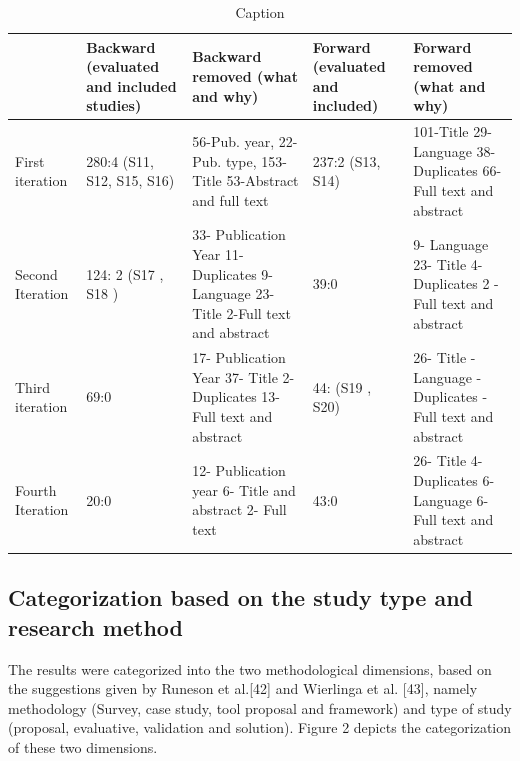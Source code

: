 \documentclass{article}
\begin{document}
\begin{table}[]
    
    \hline
    \begin{tabular}{|p{1.5cm}|p{2.5cm}|p{2.5cm}|p{2cm}|p{2cm}|}
   
         &  Backward (evaluated and included studies) & Backward removed (what and why) & Forward (evaluated and included) & Forward removed (what and why) \\
          \hline
       First iteration  &  280:4 \newline (S11\cite{metsa2007testing}, S12\cite{bjarnason2015industrial}, S15\cite{ferguson2006empirical}, S16\cite{bjarnason2014alignment}) & 56-Pub. year, 22-Pub. type, 153-Title
53-Abstract and full text & 237:2 \newline (S13\cite{aichernig2014integration}, S14\cite{bjarnason2015industrial}) & 101-Title 29-Language 38- Duplicates 66- Full text and abstract \\
\hline
Second Iteration & 124: 2 \newline (S17 \cite{melnik2006executable}, S18 \cite{bjarnason2013distances}) & 33- Publication Year 11- Duplicates 9- Language 23- Title 2-Full text  and abstract & 39:0 & 9- Language 23- Title 4- Duplicates 2 - Full text and abstract \\
\hline
Third iteration & 69:0 & 17- Publication Year 37- Title 2- Duplicates 13- Full text and abstract & 44: \newline 2 (S19 \cite{melnik2004suitability}, S20) & 26- Title \newline 6- Language \newline 4-Duplicates \newline 8-Full text and abstract \\
Fourth Iteration & 20:0 & 12- Publication year 6- Title and abstract 2- Full text & 43:0 & 26- Title 4- Duplicates 6- Language 6-Full text and abstract \\
\hline
    \end{tabular}
    \caption{Caption}
    \label{tab:my_label}
\end{table}

\subsection{Categorization based on the study type and research method}\label{ResultsCat}

The results were categorized into the two methodological dimensions, based on the suggestions given by Runeson et al.[42] and Wierlinga et al. [43], namely methodology (Survey, case study, tool proposal and framework) and type of study (proposal, evaluative, validation and solution). Figure 2 depicts the categorization of these two dimensions. 
\end{document}
